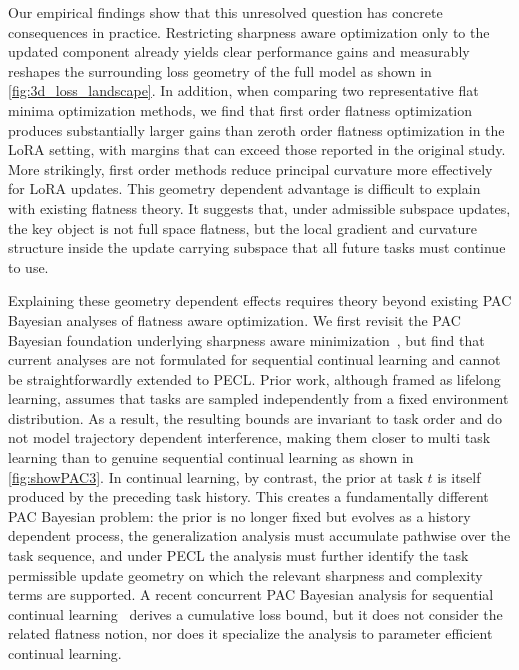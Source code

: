 \documentclass[10pt]{article} %
\begin{document}
Our empirical findings show that this unresolved question has concrete consequences in practice. Restricting sharpness aware optimization only to the updated component already yields clear performance gains and measurably reshapes the surrounding loss geometry of the full model as shown in \ref{fig:3d_loss_landscape}. In addition, when comparing two representative flat minima optimization methods, we find that first order flatness optimization produces substantially larger gains than zeroth order flatness optimization in the LoRA setting, with margins that can exceed those reported in the original study. More strikingly, first order methods reduce principal curvature more effectively for LoRA updates. This geometry dependent advantage is difficult to explain with existing flatness theory. It suggests that, under admissible subspace updates, the key object is not full space flatness, but the local gradient and curvature structure inside the update carrying subspace that all future tasks must continue to use.




Explaining these geometry dependent effects requires theory beyond existing PAC Bayesian analyses of flatness aware optimization. We first revisit the PAC Bayesian foundation underlying sharpness aware minimization~\cite{bahri-etal-2022-sharpness}, but find that current analyses are not formulated for sequential continual learning and cannot be straightforwardly extended to PECL. Prior work\cite{pentinaPACBayesianBoundLifelong2014}, although framed as lifelong learning, assumes that tasks are sampled independently from a fixed environment distribution. As a result, the resulting bounds are invariant to task order and do not model trajectory dependent interference, making them closer to multi task learning than to genuine sequential continual learning as shown in \ref{fig:showPAC3}. In continual learning, by contrast, the prior at task $t$ is itself produced by the preceding task history. This creates a fundamentally different PAC Bayesian problem: the prior is no longer fixed but evolves as a history dependent process, the generalization analysis must accumulate pathwise over the task sequence, and under PECL the analysis must further identify the task permissible update geometry on which the relevant sharpness and complexity terms are supported. A recent concurrent PAC Bayesian analysis for sequential continual learning~\cite{friedman2026pac} derives a cumulative loss bound, but it does not consider the related flatness notion, nor does it specialize the analysis to parameter efficient continual learning.
\end{document}

